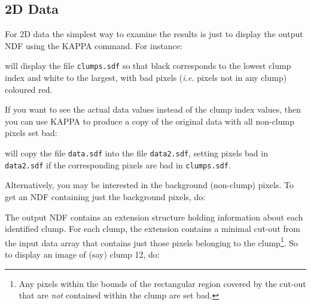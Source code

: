 \documentclass[twoside,11pt]{starlink}
\begin{document}
\subsection{2D Data}
For 2D data the simplest way to examine the results is just
to display the output NDF using the KAPPA 
command. For instance:

\small
\begin{terminalv}
\end{terminalv}
\normalsize

will display the file \verb+clumps.sdf+ so that black corresponds to the
lowest clump index and white to the largest, with bad pixels (\emph{i.e.}
pixels not in any clump) coloured red.

If you want to see the actual data values instead of the clump index
values, then you can use KAPPA  to produce a
copy of the original data with all non-clump pixels set bad:

\small
\begin{terminalv}
\end{terminalv}
\normalsize

will copy the file \verb+data.sdf+ into the file \verb+data2.sdf+,
setting pixels bad in \verb+data2.sdf+ if the corresponding pixels
are bad in  \verb+clumps.sdf+.

Alternatively, you may be interested in the background (non-clump)
pixels. To get an NDF containing just the background pixels, do:

\small
\begin{terminalv}
\end{terminalv}
\normalsize

The output NDF contains an extension structure holding information
about each identified clump. For each clump, the extension contains a
minimal cut-out from the input data array that contains just those pixels
belonging to the clump\footnote{Any pixels within the bounds of the
rectangular region covered by the cut-out that are \emph{not} contained
within the clump are set bad.}. So to display an image of (say) clump 12,
do:

\small
\begin{terminalv}
\end{terminalv}
\normalsize
\end{document}
